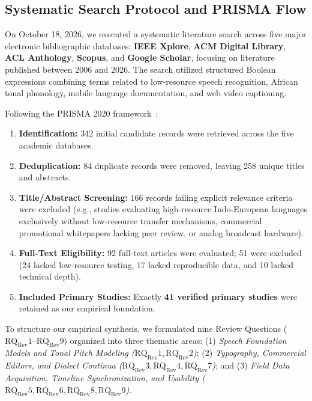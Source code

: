 \documentclass[conference]{IEEEtran}
\begin{document}
\subsection{Systematic Search Protocol and PRISMA Flow}
\label{sec:sota:prisma}

On October 18, 2026, we executed a systematic literature search across five major electronic bibliographic databases: \textbf{IEEE Xplore}, \textbf{ACM Digital Library}, \textbf{ACL Anthology}, \textbf{Scopus}, and \textbf{Google Scholar}, focusing on literature published between 2006 and 2026. The search utilized structured Boolean expressions combining terms related to low-resource speech recognition, African tonal phonology, mobile language documentation, and web video captioning.

Following the PRISMA 2020 framework~\cite{nunamaker1990systems}:
\begin{enumerate}
    \item \textbf{Identification:} 342 initial candidate records were retrieved across the five academic databases.
    \item \textbf{Deduplication:} 84 duplicate records were removed, leaving 258 unique titles and abstracts.
    \item \textbf{Title/Abstract Screening:} 166 records failing explicit relevance criteria were excluded (e.g., studies evaluating high-resource Indo-European languages exclusively without low-resource transfer mechanisms, commercial promotional whitepapers lacking peer review, or analog broadcast hardware).
    \item \textbf{Full-Text Eligibility:} 92 full-text articles were evaluated; 51 were excluded (24 lacked low-resource testing, 17 lacked reproducible data, and 10 lacked technical depth).
    \item \textbf{Included Primary Studies:} Exactly \textbf{41 verified primary studies} were retained as our empirical foundation.
\end{enumerate}

To structure our empirical synthesis, we formulated nine Review Questions ($\text{RQ}_{\text{Rev}}1$--$\text{RQ}_{\text{Rev}}9$) organized into three thematic areas: (1) \textit{Speech Foundation Models and Tonal Pitch Modeling ($\text{RQ}_{\text{Rev}}1, \text{RQ}_{\text{Rev}}2$)}; (2) \textit{Typography, Commercial Editors, and Dialect Continua ($\text{RQ}_{\text{Rev}}3, \text{RQ}_{\text{Rev}}4, \text{RQ}_{\text{Rev}}7$)}; and (3) \textit{Field Data Acquisition, Timeline Synchronization, and Usability ($\text{RQ}_{\text{Rev}}5, \text{RQ}_{\text{Rev}}6, \text{RQ}_{\text{Rev}}8, \text{RQ}_{\text{Rev}}9$)}.
\end{document}

